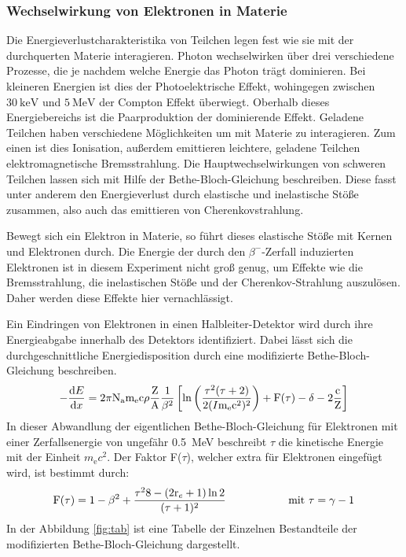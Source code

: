 \subsubsection{Wechselwirkung von Elektronen in Materie}
Die Energieverlustcharakteristika von Teilchen legen fest wie sie mit der durchquerten Materie interagieren. Photon wechselwirken über drei verschiedene Prozesse, die je nachdem welche Energie das Photon trägt dominieren. Bei kleineren Energien ist dies der Photoelektrische Effekt, wohingegen zwischen $\SI{30}{\kilo\electronvolt}$ und $\SI{5}{\mega\electronvolt}$ der Compton Effekt überwiegt. Oberhalb dieses Energiebereichs ist die Paarproduktion der dominierende Effekt. Geladene Teilchen haben verschiedene Möglichkeiten um mit Materie zu interagieren. Zum einen ist dies Ionisation, außerdem emittieren leichtere, geladene Teilchen elektromagnetische Bremsstrahlung. Die Hauptwechselwirkungen von schweren Teilchen lassen sich mit Hilfe der Bethe-Bloch-Gleichung beschreiben. Diese fasst unter anderem den Energieverlust durch elastische und inelastische Stöße zusammen, also auch das emittieren von Cherenkovstrahlung.

Bewegt sich ein Elektron in Materie, so führt dieses elastische Stöße mit Kernen und Elektronen durch. Die Energie der durch den $\beta^{-}$-Zerfall induzierten Elektronen ist in diesem Experiment nicht groß genug, um Effekte wie die Bremsstrahlung, die inelastischen Stöße und der Cherenkov-Strahlung auszulösen. Daher werden diese Effekte hier vernachlässigt.

Ein Eindringen von Elektronen in einen Halbleiter-Detektor wird durch ihre Energieabgabe innerhalb des Detektors identifiziert. Dabei lässt sich die durchgeschnittliche Energiedisposition durch eine modifizierte Bethe-Bloch-Gleichung beschreiben.
\begin{equation*}
  -\frac{\text{d}E}{\text{d}x} =
  2\pi \text{N}_\text{a} \text{m}_\text{e} \text{c}\rho \frac{\text{Z}}{\text{A}}\frac{1}{\beta^2}
  \left[\text{ln}\left(\frac{\tau^2(\tau + 2)}{2(I\/\text{m}_\text{e}\text{c}^2)^2}\right)
  + \text{F}(\tau) - \delta - 2\frac{\text{c}}{\text{Z}}\right]
	\label{eq:12}
\end{equation*}
In dieser Abwandlung der eigentlichen Bethe-Bloch-Gleichung für Elektronen mit einer Zerfallsenergie von ungefähr \SI{0.5}{\mega\electronvolt} beschreibt $\tau$ die kinetische Energie mit der Einheit $m_\text{e} c^2$. Der Faktor F($\tau$), welcher extra für Elektronen eingefügt wird, ist bestimmt durch:
\begin{equation*}
  \text{F}(\tau) = 1 - \beta^2 + \frac{\tau^2\/8 - (2\text{r}_e + 1) \ln2}{(\tau + 1)^2}
  \hspace{2cm}\text{mit } \tau = \gamma - 1
\end{equation*}
In der Abbildung \ref{fig:tab} ist eine Tabelle der Einzelnen Bestandteile der modifizierten Bethe-Bloch-Gleichung dargestellt.

